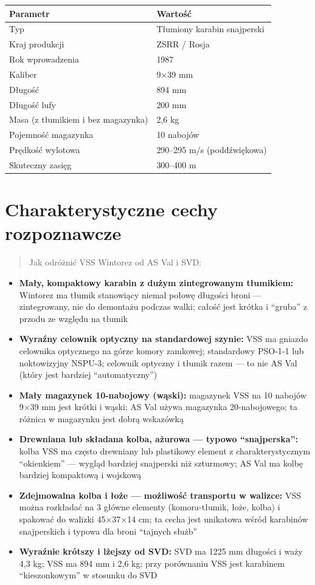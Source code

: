 \documentclass[12pt,openany,oneside]{book}
\providecommand{\tightlist}{%
  \setlength{\itemsep}{0pt}\setlength{\parskip}{0pt}}
\begin{document}
\begin{longtable}[]{@{}ll@{}}
\toprule\noalign{}
Parametr & Wartość \\
\midrule\noalign{}
\endhead
\bottomrule\noalign{}
\endlastfoot
Typ & Tłumiony karabin snajperski \\
Kraj produkcji & ZSRR / Rosja \\
Rok wprowadzenia & 1987 \\
Kaliber & 9×39 mm \\
Długość & 894 mm \\
Długość lufy & 200 mm \\
Masa (z tłumikiem i bez magazynka) & 2,6 kg \\
Pojemność magazynka & 10 nabojów \\
Prędkość wylotowa & 290--295 m/s (poddźwiękowa) \\
Skuteczny zasięg & 300--400 m \\
\end{longtable}

\section{Charakterystyczne cechy
rozpoznawcze}\label{charakterystyczne-cechy-rozpoznawcze-61}

\begin{quote}
Jak odróżnić VSS Wintorez od AS Val i SVD:
\end{quote}

\begin{itemize}
\tightlist
\item
  \textbf{Mały, kompaktowy karabin z dużym zintegrowanym tłumikiem:}
  Wintorez ma tłumik stanowiący niemal połowę długości broni ---
  zintegrowany, nie do demontażu podczas walki; całość jest krótka i
  ``gruba'' z przodu ze względu na tłumik
\item
  \textbf{Wyraźny celownik optyczny na standardowej szynie:} VSS ma
  gniazdo celownika optycznego na górze komory zamkowej; standardowy
  PSO-1-1 lub noktowizyjny NSPU-3; celownik optyczny i tłumik razem ---
  to nie AS Val (który jest bardziej ``automatyczny'')
\item
  \textbf{Mały magazynek 10-nabojowy (wąski):} magazynek VSS na 10
  nabojów 9×39 mm jest krótki i wąski; AS Val używa magazynka
  20-nabojowego; ta różnica w magazynku jest dobrą wskazówką
\item
  \textbf{Drewniana lub składana kolba, ażurowa --- typowo
  ``snajperska'':} kolba VSS ma często drewniany lub plastikowy element
  z charakterystycznym ``okienkiem'' --- wygląd bardziej snajperski niż
  szturmowy; AS Val ma kolbę bardziej kompaktową i wojskową
\item
  \textbf{Zdejmowalna kolba i łoże --- możliwość transportu w walizce:}
  VSS można rozkładać na 3 główne elementy (komora-tłumik, łoże, kolba)
  i spakować do walizki 45×37×14 cm; ta cecha jest unikatowa wśród
  karabinów snajperskich i typowa dla broni ``tajnych służb''
\item
  \textbf{Wyraźnie krótszy i lżejszy od SVD:} SVD ma 1225 mm długości i
  waży 4,3 kg; VSS ma 894 mm i 2,6 kg; przy porównaniu VSS jest
  karabinem ``kieszonkowym'' w stosunku do SVD
\end{itemize}
\end{document}
